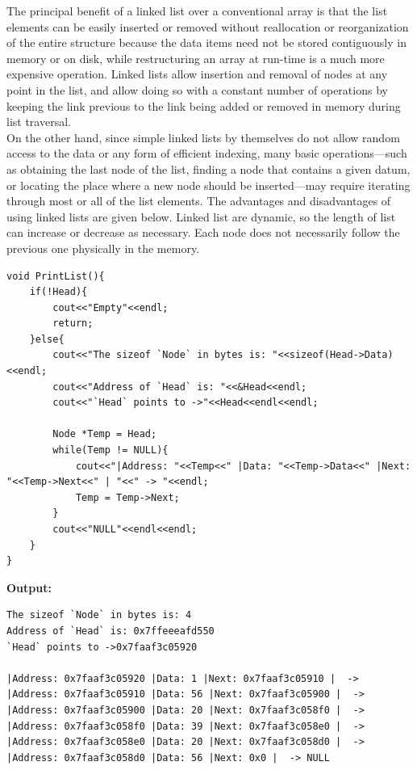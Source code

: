 The principal benefit of a linked list over a conventional array is that the list elements can be easily inserted or removed without reallocation or reorganization of the entire structure because the data items need not be stored contiguously in memory or on disk, while restructuring an array at run-time is a much more expensive operation. Linked lists allow insertion and removal of nodes at any point in the list, and allow doing so with a constant number of operations by keeping the link previous to the link being added or removed in memory during list traversal.\\

On the other hand, since simple linked lists by themselves do not allow random access to the data or any form of efficient indexing, many basic operations—such as obtaining the last node of the list, finding a node that contains a given datum, or locating the place where a new node should be inserted—may require iterating through most or all of the list elements. The advantages and disadvantages of using linked lists are given below. Linked list are dynamic, so the length of list can increase or decrease as necessary. Each node does not necessarily follow the previous one physically in the memory.\\


\begin{verbatim}
void PrintList(){
    if(!Head){
        cout<<"Empty"<<endl;
        return;
    }else{
        cout<<"The sizeof `Node` in bytes is: "<<sizeof(Head->Data)<<endl;
        cout<<"Address of `Head` is: "<<&Head<<endl;
        cout<<"`Head` points to ->"<<Head<<endl<<endl;
    
        Node *Temp = Head;
        while(Temp != NULL){
            cout<<"|Address: "<<Temp<<" |Data: "<<Temp->Data<<" |Next: "<<Temp->Next<<" | "<<" -> "<<endl;
            Temp = Temp->Next;
        }
        cout<<"NULL"<<endl<<endl;
    }
}
\end{verbatim}

\textbf{Output:}

\begin{verbatim}
The sizeof `Node` in bytes is: 4
Address of `Head` is: 0x7ffeeeafd550
`Head` points to ->0x7faaf3c05920

|Address: 0x7faaf3c05920 |Data: 1 |Next: 0x7faaf3c05910 |  -> 
|Address: 0x7faaf3c05910 |Data: 56 |Next: 0x7faaf3c05900 |  -> 
|Address: 0x7faaf3c05900 |Data: 20 |Next: 0x7faaf3c058f0 |  -> 
|Address: 0x7faaf3c058f0 |Data: 39 |Next: 0x7faaf3c058e0 |  -> 
|Address: 0x7faaf3c058e0 |Data: 20 |Next: 0x7faaf3c058d0 |  -> 
|Address: 0x7faaf3c058d0 |Data: 56 |Next: 0x0 |  -> NULL
\end{verbatim}

